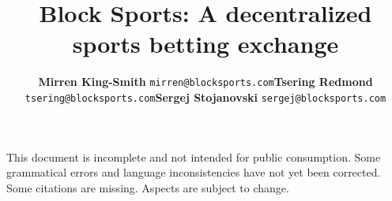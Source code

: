 \documentclass{article}
\begin{document}
\noindent
This document is incomplete and not intended for public consumption. Some grammatical errors and language inconsistencies have not yet been corrected. Some citations are missing. Aspects are subject to change.

\pagebreak

\title{{\bfseries Block Sports}: A decentralized sports betting exchange}
\renewcommand{\arraystretch}{1}
\author{
	\footnotesize
	\hspace*{+.4cm}
	\begin{tabularx}{\textwidth}{ p{3.75cm} p{3.75cm} p{3.75cm}}
		\begin{center}
		\item {\bfseries Mirren King-Smith} \texttt{mirren@blocksports.com} 
	 	\end{center} &
	 	\begin{center}
		\item {\bfseries Tsering Redmond} \texttt{tsering@blocksports.com}
	 	\end{center} &
	 	\begin{center}
		\item {\bfseries Sergej Stojanovski} \texttt{sergej@blocksports.com}
	 	\end{center}
	\end{tabularx}
}

\date{}

\maketitle
\renewcommand{\arraystretch}{2}
\end{document}

